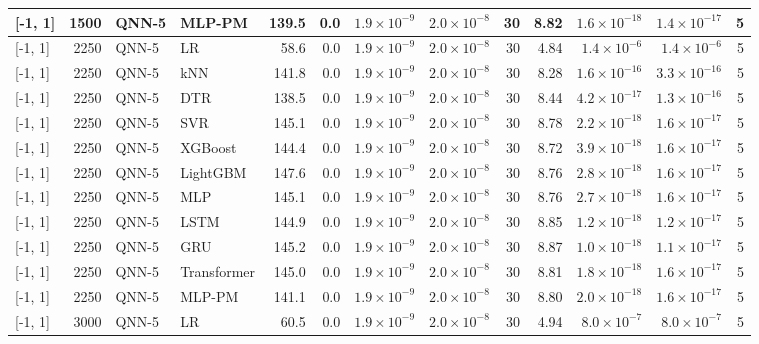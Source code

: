 \begin{longtable}{lrllrrrrrrrrr}
{[-1, 1]} & 1500 & QNN-5 & MLP-PM & 139.5 & 0.0 & $1.9 \times 10^{-9}$ & $2.0 \times 10^{-8}$ & 30 & 8.82 & $1.6 \times 10^{-18}$ & $1.4 \times 10^{-17}$ & 5 \\
\midrule
{[-1, 1]} & 2250 & QNN-5 & LR & 58.6 & 0.0 & $1.9 \times 10^{-9}$ & $2.0 \times 10^{-8}$ & 30 & 4.84 & $1.4 \times 10^{-6}$ & $1.4 \times 10^{-6}$ & 5 \\
{[-1, 1]} & 2250 & QNN-5 & kNN & 141.8 & 0.0 & $1.9 \times 10^{-9}$ & $2.0 \times 10^{-8}$ & 30 & 8.28 & $1.6 \times 10^{-16}$ & $3.3 \times 10^{-16}$ & 5 \\
{[-1, 1]} & 2250 & QNN-5 & DTR & 138.5 & 0.0 & $1.9 \times 10^{-9}$ & $2.0 \times 10^{-8}$ & 30 & 8.44 & $4.2 \times 10^{-17}$ & $1.3 \times 10^{-16}$ & 5 \\
{[-1, 1]} & 2250 & QNN-5 & SVR & 145.1 & 0.0 & $1.9 \times 10^{-9}$ & $2.0 \times 10^{-8}$ & 30 & 8.78 & $2.2 \times 10^{-18}$ & $1.6 \times 10^{-17}$ & 5 \\
{[-1, 1]} & 2250 & QNN-5 & XGBoost & 144.4 & 0.0 & $1.9 \times 10^{-9}$ & $2.0 \times 10^{-8}$ & 30 & 8.72 & $3.9 \times 10^{-18}$ & $1.6 \times 10^{-17}$ & 5 \\
{[-1, 1]} & 2250 & QNN-5 & LightGBM & 147.6 & 0.0 & $1.9 \times 10^{-9}$ & $2.0 \times 10^{-8}$ & 30 & 8.76 & $2.8 \times 10^{-18}$ & $1.6 \times 10^{-17}$ & 5 \\
{[-1, 1]} & 2250 & QNN-5 & MLP & 145.1 & 0.0 & $1.9 \times 10^{-9}$ & $2.0 \times 10^{-8}$ & 30 & 8.76 & $2.7 \times 10^{-18}$ & $1.6 \times 10^{-17}$ & 5 \\
{[-1, 1]} & 2250 & QNN-5 & LSTM & 144.9 & 0.0 & $1.9 \times 10^{-9}$ & $2.0 \times 10^{-8}$ & 30 & 8.85 & $1.2 \times 10^{-18}$ & $1.2 \times 10^{-17}$ & 5 \\
{[-1, 1]} & 2250 & QNN-5 & GRU & 145.2 & 0.0 & $1.9 \times 10^{-9}$ & $2.0 \times 10^{-8}$ & 30 & 8.87 & $1.0 \times 10^{-18}$ & $1.1 \times 10^{-17}$ & 5 \\
{[-1, 1]} & 2250 & QNN-5 & Transformer & 145.0 & 0.0 & $1.9 \times 10^{-9}$ & $2.0 \times 10^{-8}$ & 30 & 8.81 & $1.8 \times 10^{-18}$ & $1.6 \times 10^{-17}$ & 5 \\
{[-1, 1]} & 2250 & QNN-5 & MLP-PM & 141.1 & 0.0 & $1.9 \times 10^{-9}$ & $2.0 \times 10^{-8}$ & 30 & 8.80 & $2.0 \times 10^{-18}$ & $1.6 \times 10^{-17}$ & 5 \\
\midrule
{[-1, 1]} & 3000 & QNN-5 & LR & 60.5 & 0.0 & $1.9 \times 10^{-9}$ & $2.0 \times 10^{-8}$ & 30 & 4.94 & $8.0 \times 10^{-7}$ & $8.0 \times 10^{-7}$ & 5 \\

\end{longtable}
